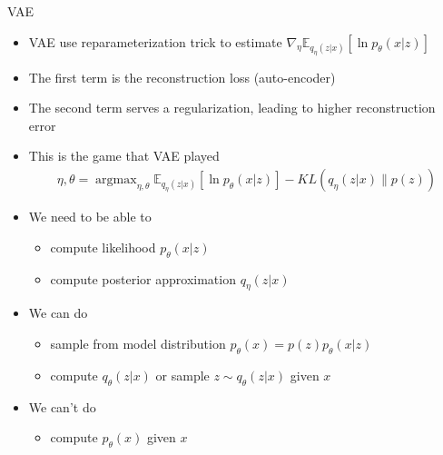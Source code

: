 \documentclass[compress]{beamer}
\newcommand{\expects}[2]{\mathbb{E}_{#1} \left[ #2 \right]}
\begin{document}
\begin{frame}[allowframebreaks]{VAE}
\begin{itemize}
        \item VAE use reparameterization trick to estimate $\nabla_\eta \expects{q_{\eta}(z|x)}{\ln p_{\theta}(x|z)}$
        \item The first term is the reconstruction loss (auto-encoder)
        \item The second term serves a regularization, leading to higher reconstruction error
    \end{itemize}
    \framebreak
    \begin{itemize}
        \item This is the game that VAE played
            \begin{align*}
                \eta, \theta = \mathop{argmax}_{\eta, \theta} \expects{q_{\eta}(z|x)}{\ln p_{\theta}(x|z)} - KL(q_{\eta}(z|x)\|p(z))
            \end{align*}
        \item We need to be able to
            \begin{itemize}
                \item compute likelihood $p_\theta(x|z)$
                \item compute posterior approximation $q_{\eta}(z|x)$
            \end{itemize}
        \item We can do
            \begin{itemize}
                \item sample from model distribution $p_\theta(x)=p(z)p_\theta(x|z)$
                \item compute $q_{\theta}(z|x)$ or sample $z\sim q_{\theta}(z|x)$ given $x$
            \end{itemize}
        \item We can't do
            \begin{itemize}
                \item compute $p_{\theta}(x)$ given $x$
            \end{itemize}
    \end{itemize}
\end{frame}
\end{document}
